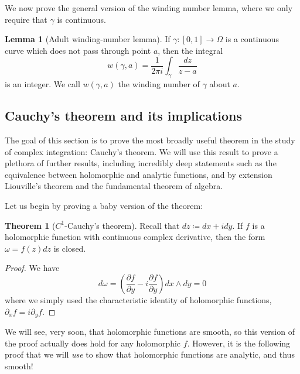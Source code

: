 \documentclass[aps,pra,showpacs,notitlepage,onecolumn,superscriptaddress,nofootinbib]{revtex4-1}
\theoremstyle{definition}
\newtheorem{lemma}{Lemma}[section]
\newtheorem{theorem}{Theorem}[section]
\begin{document}
\noindent We now prove the general version of the winding number lemma, where we only require that $\gamma$ is continuous.

\begin{lemma}[Adult winding-number lemma]
  If $\gamma : [0, 1] \rightarrow \Omega$ is a continuous curve which does not pass through point $a$, then the integral
  \begin{equation}
    w(\gamma, a) = \frac{1}{2\pi i} \displaystyle\int_{\gamma} \frac{dz}{z - a}
  \end{equation}
  is an integer. We call $w(\gamma, a)$ the winding number of $\gamma$ about $a$.
  \end{lemma}

\subsection{Cauchy's theorem and its implications}

\noindent The goal of this section is to prove the most broadly useful theorem in the study of complex integration: Cauchy's theorem. We will use this result to prove
a plethora of further results, including incredibly deep statements such as the equivalence between holomorphic and analytic functions, and by extension Liouville's theorem
and the fundamental theorem of algebra.
\newline

\noindent Let us begin by proving a baby version of the theorem:

\begin{theorem}[$C^1$-Cauchy's theorem]
  Recall that $dz \coloneqq dx + i dy$. If $f$ is a holomorphic function with continuous complex derivative, then the form $\omega = f(z) dz$ is closed.
\end{theorem}
\begin{proof}
  We have
  \begin{equation}
    d\omega = \left( \frac{\partial f}{\partial y} - i \frac{\partial f}{\partial y} \right) dx \wedge dy = 0
  \end{equation}
  where we simply used the characteristic identity of holomorphic functions, $\partial_x f = i \partial_y f$.
\end{proof}

\noindent We will see, very soon, that holomorphic functions are smooth, so this version of the proof actually does hold for any holomorphic $f$. However, it is the following proof
that we will \emph{use} to show that holomorphic functions are analytic, and thus smooth!
\end{document}
